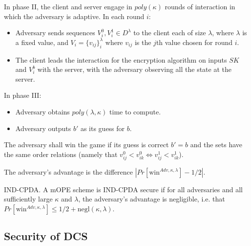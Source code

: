 \documentclass[12pt]{article}
\newenvironment{definition}[1][Definition]{\begin{trivlist}
\item[\hskip \labelsep {\bfseries #1}]}{\end{trivlist}}
\begin{document}
In phase II, the client and server engage in $poly(\kappa)$ rounds of interaction in which the adversary is adaptive. In each round $i$:
\begin{itemize}
  \item Adversary sends sequences $V_i^0, V_i^1 \in D^{\lambda}$ to the client each of size $\lambda$, where $\lambda$ is a fixed value, and $V_i = \{ v_{ij} \}_i^{\lambda}$ where $v_{ij}$ is the $j$th value chosen for round $i$.
  \item The client leads the interaction for the encryption algorithm on inputs $SK$ and $V_i^b$ with the server, with the adversary observing all the state at the server.
\end{itemize} 

In phase III:
\begin{itemize}
  \item Adversary obtains $poly(\lambda, \kappa)$ time to compute.
  \item Adversary outputs $b'$ as its guess for $b$. 
\end{itemize} 

The adversary shall win the game if its guess is correct $b' = b$ and the sets have the same order relations (namely that $v_{ij}^0 < v_{ik}^0 \Leftrightarrow v_{ij}^1 < v_{ik}^1$). 

\begin{definition}
  The adversary's advantage is the difference $|Pr[\textrm{win}^{Adv, \kappa, \lambda}] - 1/2|$.
\end{definition}

\begin{definition}
  IND-CPDA. A mOPE scheme is IND-CPDA secure if for all adversaries and all sufficiently large $\kappa$ and $\lambda$, the adversary's advantage is negligible, i.e. that $Pr[\textrm{win}^{Adv, \kappa, \lambda}] \leq 1/2 + \textrm{negl}(\kappa, \lambda)$.
\end{definition}

\subsection{Security of DCS}
\end{document}
